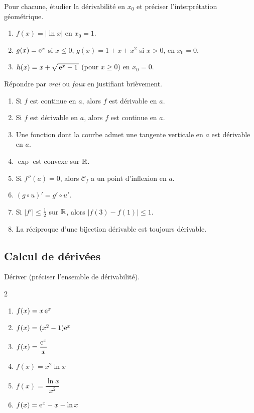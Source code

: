 Pour chacune, étudier la dérivabilité en $x_0$ et préciser l'interprétation
géométrique.
\begin{enumerate}
	\item $f(x)=\bigl|\ln x\bigr|$ en $x_0=1$.
	\item $g(x)=\mathrm{e}^{x}$ si $x\leq 0$, $g(x)=1+x+x^{2}$ si $x>0$, en $x_0=0$.
	\item $h(x)=x+\sqrt{\,\mathrm{e}^{x}-1\,}$ (pour $x\geq 0$) en $x_0=0$.
\end{enumerate}

Répondre par \emph{vrai} ou \emph{faux} en justifiant brièvement.
\begin{enumerate}
	\item Si $f$ est continue en $a$, alors $f$ est dérivable en $a$.
	\item Si $f$ est dérivable en $a$, alors $f$ est continue en $a$.
	\item Une fonction dont la courbe admet une tangente verticale en $a$ est
	dérivable en $a$.
	\item $\exp$ est convexe sur $\mathbb{R}$.
	\item Si $f''(a)=0$, alors $\mathcal C_f$ a un point d'inflexion en $a$.
	\item $(g\circ u)'=g'\circ u'$.
	\item Si $|f'|\leq \tfrac12$ sur $\mathbb{R}$, alors $|f(3)-f(1)|\leq 1$.
	\item La réciproque d'une bijection dérivable est toujours dérivable.
\end{enumerate}

\subsection{Calcul de dérivées}

Dériver (préciser l'ensemble de dérivabilité).
\begin{multicols}{2}
\begin{enumerate}
	\item $f(x)=x\,\mathrm{e}^{x}$
	\item $f(x)=(x^{2}-1)\mathrm{e}^{x}$
	\item $f(x)=\dfrac{\mathrm{e}^{x}}{x}$
	\item $f(x)=x^{2}\ln x$
	\item $f(x)=\dfrac{\ln x}{x^{2}}$
	\item $f(x)=\mathrm{e}^{x}-x-\ln x$
\end{enumerate}
\end{multicols}

